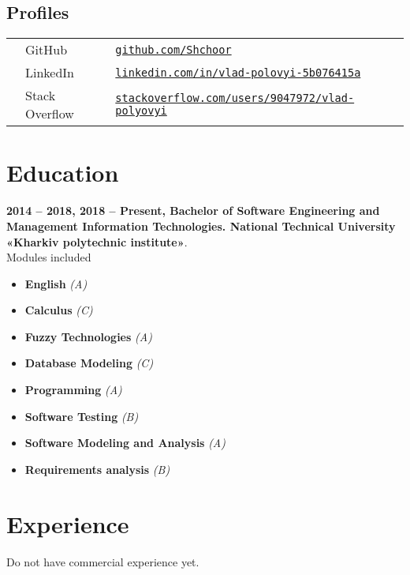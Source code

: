 \documentclass[a4paper]{article}
\begin{document}
	\subsection*{Profiles}
	\begin{tabular}{@{}lll}
		\faGithub & GitHub & \href{https://github.com/Shchoor}{\texttt{github.com/Shchoor}} \\
		\faLinkedin & LinkedIn & \href{https://www.linkedin.com/in/vlad-polovyi-5b076415a/}{\texttt{linkedin.com/in/vlad-polovyi-5b076415a}} \\
		\faStackOverflow & Stack Overflow & \href{https://stackoverflow.com/users/9047972/vlad-polyovyi}{\texttt{stackoverflow.com/users/9047972/vlad-polyovyi}} \\
	\end{tabular}

	\section*{Education}
	\textbf{2014 -- 2018, 2018 -- Present, Bachelor of Software Engineering and Management Information Technologies.
National Technical University «Kharkiv polytechnic institute»}. \\
	Modules included
	\begin{multicols}{2}
	\begin{itemize}
		\item \textbf{English} \textit{(A)}
		\item \textbf{Calculus} \textit{(C)}
		\item \textbf{Fuzzy Technologies} \textit{(A)}
		\item \textbf{Database Modeling} \textit{(C)}
		\item \textbf{Programming} \textit{(A)}
		\item \textbf{Software Testing} \textit{(B)}
		\item \textbf{Software Modeling and Analysis} \textit{(A)}
		\item \textbf{Requirements analysis} \textit{(B)}
	\end{itemize}
	\end{multicols}

	\section*{Experience}
	Do not have commercial experience yet.
	
	
	
\end{document}
